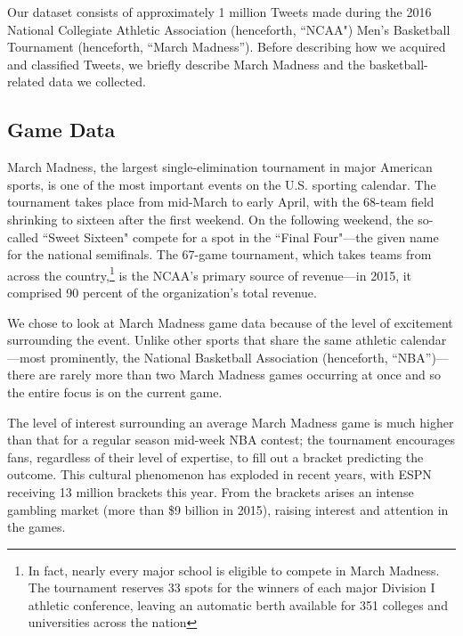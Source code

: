 \documentclass[12pt]{article}
\begin{document}
\begin{doublespacing}
Our dataset consists of approximately 1 million Tweets made during the 2016 National Collegiate Athletic Association (henceforth, ``NCAA") Men's Basketball Tournament (henceforth, ``March Madness''). Before describing how we acquired and classified Tweets, we briefly describe March Madness and the basketball-related data we collected. 

\subsection{Game Data}

March Madness, the largest single-elimination tournament in major American sports, is one of the most important events on the U.S. sporting calendar. The tournament takes place from mid-March to early April, with the 68-team field shrinking to sixteen after the first weekend. On the following weekend, the so-called ``Sweet Sixteen" compete for a spot in the ``Final Four"---the given name for the national semifinals. The 67-game tournament, which takes teams from across the country,\footnote{In fact, nearly every major school is eligible to compete in March Madness. The tournament reserves 33 spots for the winners of each major Division I athletic conference, leaving an automatic berth available for 351 colleges and universities across the nation} is the NCAA's primary source of revenue---in 2015, it comprised 90 percent of the organization's total revenue. 

We chose to look at March Madness game data because of the level of excitement surrounding the event. Unlike other sports that share the same athletic calendar---most prominently, the National Basketball Association (henceforth, ``NBA'')---there are rarely more than two March Madness games occurring at once and so the entire focus is on the current game. 

The level of interest surrounding an average March Madness game is much higher than that for a regular season mid-week NBA contest; the tournament encourages fans, regardless of their level of expertise, to fill out a bracket predicting the outcome. This cultural phenomenon has exploded in recent years, with ESPN receiving 13 million brackets this year. From the brackets arises an intense gambling market (more than \$9 billion in 2015), raising interest and attention in the games. 


\end{doublespacing}
\end{document}

